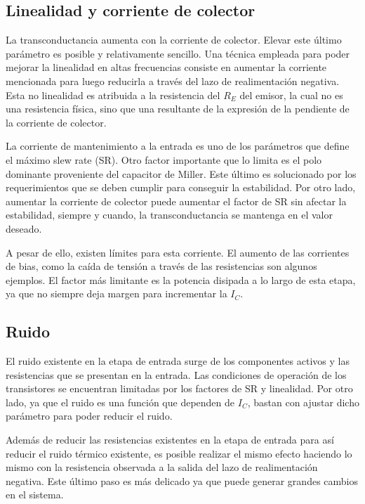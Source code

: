 \subsection{Linealidad y corriente de colector}

La transconductancia aumenta con la corriente de colector. Elevar este último parámetro es posible y relativamente sencillo. Una técnica empleada para poder mejorar la linealidad en altas frecuencias consiste en aumentar la corriente mencionada para luego reducirla a través del lazo de realimentación negativa. Esta no linealidad es atribuida a la resistencia del $R_E$ del emisor, la cual no es una resistencia física, sino que una resultante de la expresión de la pendiente de la corriente de colector. 

La corriente de mantenimiento a la entrada es uno de los parámetros que define el máximo slew rate (SR). Otro factor importante que lo limita es el polo dominante proveniente del capacitor de Miller. Este último es solucionado por los requerimientos que se deben cumplir para conseguir la estabilidad. Por otro lado, aumentar la corriente de colector puede aumentar el factor de SR sin afectar la estabilidad, siempre y cuando, la transconductancia se mantenga en el valor deseado. 

A pesar de ello, existen límites para esta corriente. El aumento de las corrientes de bias, como la caída de tensión a través de las resistencias son algunos ejemplos. El factor más limitante es la potencia disipada a lo largo de esta etapa, ya que no siempre deja margen para incrementar la $I_C$. 


\subsection{Ruido}
El ruido existente en la etapa de entrada surge de los componentes activos y las resistencias que se presentan en la entrada. Las condiciones de operación de los transistores se encuentran limitadas por los factores de SR y linealidad. Por otro lado, ya que el ruido es una función que dependen de $I_C$, bastan con ajustar dicho parámetro para poder reducir el ruido. 

Además de reducir las resistencias existentes en la etapa de entrada para así reducir el ruido térmico existente, es posible realizar el mismo efecto haciendo lo mismo con la resistencia observada a la salida del lazo de realimentación negativa. Este último paso es más delicado ya que puede generar grandes cambios en el sistema. 

